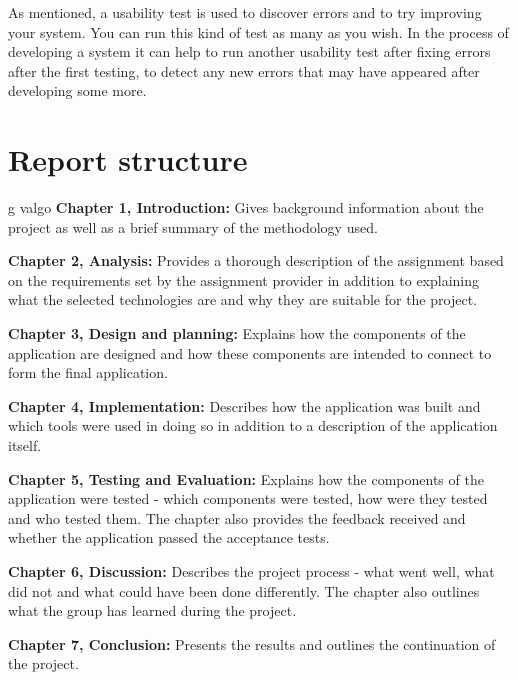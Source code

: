 As mentioned, a usability test is used to discover errors and to try improving your system.\cite{usability-testing} You can run this kind of test as many as you wish. In the process of developing a system it can help to run another usability test after fixing errors after the first testing, to detect any new errors that may have appeared after developing some more. %

\section{Report structure}
g valgo
\textbf{Chapter 1, Introduction:}
Gives background information about the project as well as a brief summary of the methodology used.

\textbf{Chapter 2, Analysis:}
Provides a thorough description of the assignment based on the requirements set by the assignment provider in addition to explaining what the selected technologies are and why they are suitable for the project.

\textbf{Chapter 3, Design and planning:}
Explains how the components of the application are designed and how these components are intended to connect to form the final application.

\textbf{Chapter 4, Implementation:}
Describes how the application was built and which tools were used in doing so in addition to a description of the application itself.

\textbf{Chapter 5, Testing and Evaluation:}
Explains how the components of the application were tested - which components were tested, how were they tested and who tested them.
The chapter also provides the feedback received and whether the application passed the acceptance tests.

\textbf{Chapter 6, Discussion:}
Describes the project process - what went well, what did not and what could have been done differently.
The chapter also outlines what the group has learned during the project.

\textbf{Chapter 7, Conclusion:}
Presents the results and outlines the continuation of the project.
